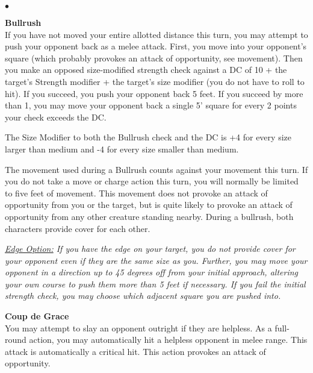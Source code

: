 \begin{list}{$\bullet$}{\itemspace}\hypertarget{combat:bullrush}{}
\item\textbf{{Bullrush}}\\ \small
If you have not moved your entire allotted distance this turn, you may attempt to push your opponent back as a melee attack. First, you move into your opponent's square (which probably provokes an attack of opportunity, see movement). Then you make an opposed size-modified strength check against a DC of 10 + the target's Strength modifier + the target's size modifier (you do not have to roll to hit). If you succeed, you push your opponent back 5 feet. If you succeed by more than 1, you may move your opponent back a single 5' square for every 2 points your check exceeds the DC.

 The Size Modifier to both the Bullrush check and the DC is +4 for every size larger than medium and -4 for every size smaller than medium.

 The movement used during a Bullrush counts against your movement this turn. If you do not take a move or charge action this turn, you will normally be limited to five feet of movement. This movement does not provoke an attack of opportunity from you or the target, but is quite likely to provoke an attack of opportunity from any other creature standing nearby. During a bullrush, both characters provide cover for each other.

\smallskip\emph{\underline{Edge Option:} If you have the edge on your target, you do not provide cover for your opponent even if they are the same size as you. Further, you may move your opponent in a direction up to 45 degrees off from your initial approach, altering your own course to push them more than 5 feet if necessary. If you fail the initial strength check, you may choose which adjacent square you are pushed into.}\\

\hypertarget{combat:coupdegrace}{}
\normalsize\item\textbf{{Coup de Grace}}\\\small
You may attempt to slay an opponent outright if they are helpless. As a full-round action, you may automatically hit a helpless opponent in melee range. This attack is automatically a critical hit. This action provokes an attack of opportunity.



\end{list}
